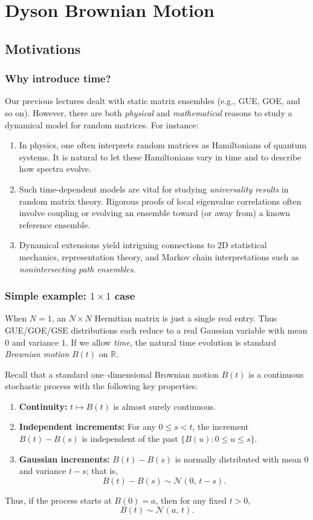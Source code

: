 \documentclass[letterpaper,11pt,oneside,reqno]{book}
\numberwithin{equation}{chapter}  %
\theoremstyle{definition}
\begin{document}
\chapter{Dyson Brownian Motion}
\label{chap:lecture10}






\section{Motivations}
\subsection{Why introduce time?}
Our previous lectures dealt with static matrix ensembles (e.g., GUE, GOE, and so on). However, there are both \emph{physical} and \emph{mathematical} reasons to study a dynamical model for random matrices. For instance:
\begin{enumerate}
\item In physics, one often interprets random matrices as Hamiltonians of quantum systems. It is natural to let these Hamiltonians vary in time and to describe how spectra evolve.
\item Such time-dependent models are vital for studying \emph{universality results} in random matrix theory. Rigorous proofs of local eigenvalue correlations often involve coupling or evolving an ensemble toward (or away from) a known reference ensemble.
\item Dynamical extensions yield intriguing connections to 2D statistical mechanics, representation theory, and Markov chain interpretations such as \emph{nonintersecting path ensembles}.
\end{enumerate}

\subsection{Simple example: $1\times1$ case}
When $N=1$, an $N\times N$ Hermitian matrix is just a single real entry. Thus GUE/GOE/GSE distributions each reduce to a real Gaussian variable with mean $0$ and variance $1$. If we allow \emph{time}, the natural time evolution is standard \emph{Brownian motion} $B(t)$ on $\mathbb{R}$.

Recall that a standard one--dimensional Brownian motion \(B(t)\) is a continuous stochastic process with the following key properties:
\begin{enumerate}
    \item \textbf{Continuity:} \(t\mapsto B(t)\) is almost surely continuous.
    \item \textbf{Independent increments:} For any \(0\leq s < t\), the increment \(B(t)-B(s)\) is independent of the past \(\{B(u): 0\le u \le s\}\).
    \item \textbf{Gaussian increments:} \(B(t)-B(s)\) is normally distributed with mean \(0\) and variance \(t-s\); that is,
    \[
    B(t)-B(s) \sim \mathcal{N}(0,\,t-s).
    \]
\end{enumerate}
Thus, if the process starts at \(B(0)=a\), then for any fixed \(t>0\),
\[
B(t)\sim \mathcal{N}(a,\,t).
\]
\end{document}
